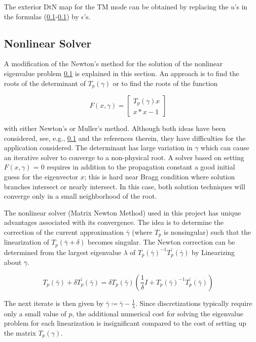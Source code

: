The exterior DtN map for the TM mode can be obtained by replacing the
$u$'s in the formulas (\ref{}-\ref{}) by $\epsilon$'s.

\subsection{Nonlinear Solver}
A modification of the Newton's method for the solution of the
nonlinear eigenvalue problem \ref{} is explained in this section. An
approach is to find the roots of the determinant of $T_p(\gamma)$ or
to find the roots of the function

\begin{equation}
F(x,\gamma) = \left[ \begin{array}{cc} T_p(\gamma)x \\
x*x-1 \end{array} \right]
\end{equation}

with either Newton's or Muller's method. Although both ideas have been
considered, see, e.g., \ref{} and the references therein, they have
difficulties for the application considered. The determinant has large
variation in $\gamma$ which can cause an iterative solver to converge
to a non-physical root. A solver based on setting $F(x,\gamma)$ = 0
requires in addition to the propagation constant a good initial guess
for the eigenvector $x$; this is hard near Bragg condition where
solution branches intersect or nearly intersect. In this case, both
solution techniques will converge only in a small neighborhood of the
root.

The nonlinear solver (Matrix Newton Method) used in this project has
unique advantages associated with its convergence. The idea is to
determine the correction of the current approximation $\bar{\gamma}$
(where $T _p$ is nonsingular) such that the linearization of
$T_p(\bar{\gamma}+\delta)$ becomes singular. The Newton correction can
be determined from the largest eigenvalue $\lambda$ of
$T_p(\bar{\gamma})^{-1} T_p^\prime (\bar{\gamma})$ by Linearizing about
$\bar{\gamma}$.

\begin{equation}
T_p(\bar{\gamma})+\delta T_p^\prime (\bar{\gamma}) = \delta T_p(\bar{\gamma})
(\frac{1}{\delta} I + T_p(\bar{\gamma})^{-1} T_p^\prime (\bar{\gamma}))
\end{equation}

The next iterate is then given by
$\bar{\gamma} \coloneqq \bar{\gamma}-\frac{1}{\lambda}$. Since discretizations typically
require only a small value of $p$, the additional numerical cost for
solving the eigenvalue problem for each linearization is insignificant
compared to the cost of setting up the matrix $T_p(\gamma)$.

